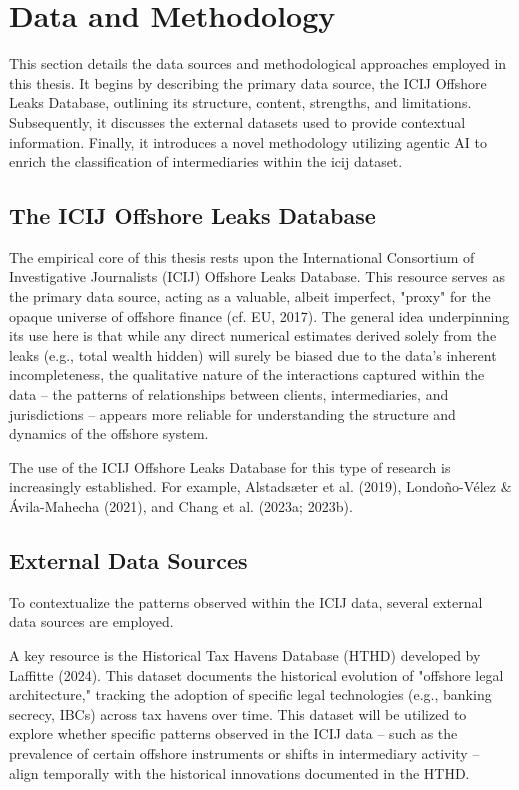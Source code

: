 \chapter{Data and Methodology}
\label{chap:data_methodology}

This section details the data sources and methodological approaches employed in this thesis. It begins by describing the primary data source, the ICIJ Offshore Leaks Database, outlining its structure, content, strengths, and limitations. Subsequently, it discusses the external datasets used to provide contextual information. Finally, it introduces a novel methodology utilizing agentic AI to enrich the classification of intermediaries within the icij dataset.

\section{The ICIJ Offshore Leaks Database}
\label{sec:3_1}

The empirical core of this thesis rests upon the International Consortium of Investigative Journalists (ICIJ) Offshore Leaks Database. This resource serves as the primary data source, acting as a valuable, albeit imperfect, "proxy" for the opaque universe of offshore finance (cf. EU, 2017). The general idea underpinning its use here is that while any direct numerical estimates derived solely from the leaks (e.g., total wealth hidden) will surely be biased due to the data's inherent incompleteness, the qualitative nature of the interactions captured within the data – the patterns of relationships between clients, intermediaries, and jurisdictions – appears more reliable for understanding the structure and dynamics of the offshore system.

The use of the ICIJ Offshore Leaks Database for this type of research is increasingly established. For example, Alstadsæter et al. (2019), Londoño-Vélez \& Ávila-Mahecha (2021), and Chang et al. (2023a; 2023b). 

\section{External Data Sources}

\label{sec:3_2}

To contextualize the patterns observed within the ICIJ data, several external data sources are employed.

A key resource is the Historical Tax Havens Database (HTHD) developed by Laffitte (2024). This dataset documents the historical evolution of "offshore legal architecture," tracking the adoption of specific legal technologies (e.g., banking secrecy, IBCs) across tax havens over time. This dataset will be utilized to explore whether specific patterns observed in the ICIJ data – such as the prevalence of certain offshore instruments or shifts in intermediary activity – align temporally with the historical innovations documented in the HTHD.

